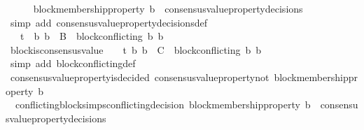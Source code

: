 \begin{isabellebody}
\ \ \ \ \isamarkupfalse%
\ {\isacartoucheopen}block{\isacharunderscore}membership{\isacharunderscore}property\ b{}\ {\isasymin}\ consensus{\isacharunderscore}value{\isacharunderscore}property{\isacharunderscore}decisions\ {\isasymsigma}{}{\isacartoucheclose}\ \isanewline
\ \ \ \ \isamarkupfalse%
\ {\isacharparenleft}simp\ add{\isacharcolon}\ consensus{\isacharunderscore}value{\isacharunderscore}property{\isacharunderscore}decisions{\isacharunderscore}def{\isacharparenright}\isanewline
\ \ \isamarkupfalse%
\ {\isachardoublequoteopen}{\isasymsigma}{}\ {\isasymin}\ {\isasymSigma}t\ {\isasymand}\ {\isacharbraceleft}b{}{\isacharcomma}\ b{}{\isacharbraceright}\ {\isasymsubseteq}\ B\ {\isasymand}\ block{\isacharunderscore}conflicting\ {\isacharparenleft}b{}{\isacharcomma}\ b{}{\isacharparenright}{\isachardoublequoteclose}\isanewline
\ \ \ \ \isamarkupfalse%
\ block{\isacharunderscore}is{\isacharunderscore}consensus{\isacharunderscore}value\ {\isacartoucheopen}{\isacharbraceleft}{\isasymsigma}{}{\isacharcomma}\ {\isasymsigma}{}{\isacharbraceright}\ {\isasymsubseteq}\ {\isasymSigma}t{\isacartoucheclose}\ {\isacartoucheopen}{\isacharbraceleft}b{}{\isacharcomma}\ b{}{\isacharbraceright}\ {\isasymsubseteq}\ C\ {\isasymand}\ block{\isacharunderscore}conflicting\ {\isacharparenleft}b{}{\isacharcomma}\ b{}{\isacharparenright}{\isacartoucheclose}\ \isamarkupfalse%
\ {\isacharparenleft}simp\ add{\isacharcolon}\ block{\isacharunderscore}conflicting{\isacharunderscore}def{\isacharparenright}\isanewline
\ \ \isamarkupfalse%
\ {\isachardoublequoteopen}consensus{\isacharunderscore}value{\isacharunderscore}property{\isacharunderscore}is{\isacharunderscore}decided\ {\isacharparenleft}consensus{\isacharunderscore}value{\isacharunderscore}property{\isacharunderscore}not\ {\isacharparenleft}block{\isacharunderscore}membership{\isacharunderscore}property\ b{}{\isacharparenright}{\isacharcomma}\ {\isasymsigma}{}{\isacharparenright}{\isachardoublequoteclose}\isanewline
\ \ \ \ \isamarkupfalse%
\ \ conflicting{\isacharunderscore}blocks{\isacharunderscore}imps{\isacharunderscore}conflicting{\isacharunderscore}decision\ {\isacartoucheopen}block{\isacharunderscore}membership{\isacharunderscore}property\ b{}\ {\isasymin}\ consensus{\isacharunderscore}value{\isacharunderscore}property{\isacharunderscore}decisions\ {\isasymsigma}{}{\isacartoucheclose}\ \isanewline

\end{isabellebody}
